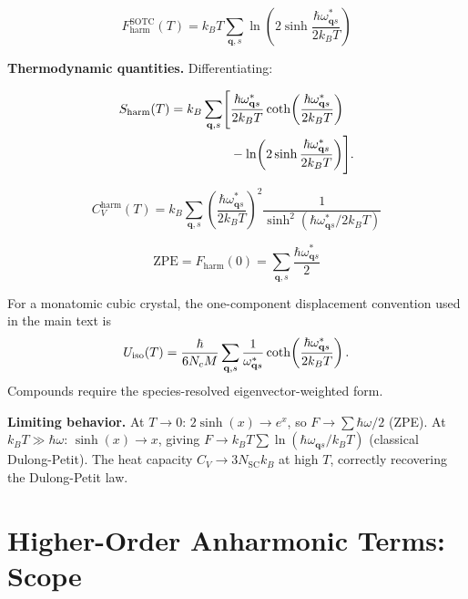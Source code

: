 \documentclass[aps,prb,reprint,amsmath,amssymb,floatfix]{revtex4-2}
\begin{document}
\begin{equation*}
\boxed{F_\text{harm}^\text{SOTC}(T) = k_BT\sum_{\mathbf{q},s}\ln\!\left(2\sinh\frac{\hbar\omega_{\mathbf{q}s}^*}{2k_BT}\right)}
\end{equation*}

\textbf{Thermodynamic quantities.} Differentiating:

\begin{equation*}
\begin{aligned}
S_{\rm harm}(T)=k_B\sum_{\mathbf q,s}\Biggl[
 &\frac{\hbar\omega_{\mathbf q s}^*}{2k_BT}
 \coth\!\left(\frac{\hbar\omega_{\mathbf q s}^*}{2k_BT}\right)\\
 &-\ln\!\left(2\sinh\frac{\hbar\omega_{\mathbf q s}^*}{2k_BT}\right)
 \Biggr].
\end{aligned}
\end{equation*}

\begin{equation*}
C_V^\text{harm}(T) = k_B\sum_{\mathbf{q},s}\left(\frac{\hbar\omega_{\mathbf{q}s}^*}{2k_BT}\right)^2\frac{1}{\sinh^2\!\left(\hbar\omega_{\mathbf{q}s}^*/2k_BT\right)}
\end{equation*}

\begin{equation*}
\text{ZPE} = F_\text{harm}(0) = \sum_{\mathbf{q},s}\frac{\hbar\omega_{\mathbf{q}s}^*}{2}
\end{equation*}

For a monatomic cubic crystal, the one-component displacement convention used
in the main text is
\begin{equation*}
U_{\rm iso}(T)=\frac{\hbar}{6N_cM}\sum_{\mathbf q,s}
\frac{1}{\omega_{\mathbf q s}^*}
\coth\!\left(\frac{\hbar\omega_{\mathbf q s}^*}{2k_BT}\right).
\end{equation*}
Compounds require the species-resolved eigenvector-weighted form.

\textbf{Limiting behavior.} At \(T\to 0\): \(2\sinh(x)\to e^x\), so
\(F\to\sum\hbar\omega/2\) (ZPE). At \(k_BT\gg\hbar\omega\):
\(\sinh(x)\to x\), giving
\(F\to k_BT\sum\ln(\hbar\omega_{\mathbf{q}s}/k_BT)\) (classical
Dulong-Petit). The heat capacity \(C_V\to 3N_\text{SC}k_B\) at high
\(T\), correctly recovering the Dulong-Petit law.

\section{Higher-Order Anharmonic Terms: Scope}
\label{appendix-i-anharmonic-free-energy-wicks-theorem-and-perturbation-theory}
\end{document}
